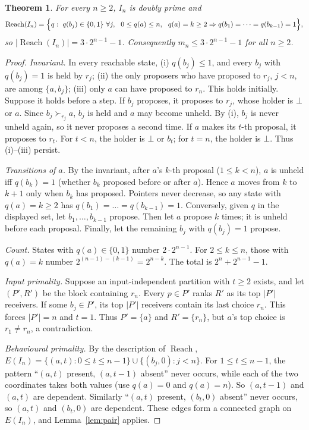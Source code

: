 \documentclass[11pt]{article}
\newtheorem{theorem}{Theorem}
\theoremstyle{definition}
\begin{document}
\begin{theorem}\label{thm:upper}
For every $n\ge2$, $I_n$ is doubly prime and
\[
\operatorname{Reach}(I_n)=\Bigl\{q:\ q(b_j)\in\{0,1\}\ \forall j,\ \ 0\le q(a)\le n,\ \
q(a)=k\ge2\Rightarrow q(b_1)=\dots=q(b_{k-1})=1\Bigr\},
\]
so $|\operatorname{Reach}(I_n)|=3\cdot2^{n-1}-1$. Consequently $m_n\le3\cdot2^{n-1}-1$ for all $n\ge2$.
\end{theorem}
\begin{proof}
\emph{Invariant.} In every reachable state, (i) $q(b_j)\le1$, and every $b_j$ with $q(b_j)=1$ is
held by $r_j$; (ii) the only proposers who have proposed to $r_j$, $j<n$, are among
$\{a,b_j\}$; (iii) only $a$ can have proposed to $r_n$. This holds initially. Suppose it holds before a step. If
$b_j$ proposes, it proposes to $r_j$, whose holder is $\bot$ or $a$. Since $b_j\succ_{r_j}a$, $b_j$ is held
and $a$ may become unheld. By (i), $b_j$ is never unheld again, so it never proposes a second time. If $a$
makes its $t$-th proposal, it proposes to $r_t$. For $t<n$, the holder is $\bot$ or $b_t$; for $t=n$, the holder is $\bot$.
Thus (i)--(iii) persist.

\emph{Transitions of $a$.} By the invariant, after $a$'s $k$-th proposal ($1\le k<n$), $a$ is unheld iff
$q(b_k)=1$ (whether $b_k$ proposed before or after $a$). Hence $a$ moves from $k$ to $k+1$ only
when $b_k$ has proposed. Pointers never decrease, so any state with $q(a)=k\ge2$ has
$q(b_1)=\dots=q(b_{k-1})=1$. Conversely, given $q$ in the displayed set, let $b_1,\dots,b_{k-1}$
propose. Then let $a$ propose $k$ times; it is unheld before each proposal. Finally, let the remaining
$b_j$ with $q(b_j)=1$ propose.

\emph{Count.} States with $q(a)\in\{0,1\}$ number $2\cdot2^{n-1}$. For $2\le k\le n$, those with
$q(a)=k$ number $2^{(n-1)-(k-1)}=2^{n-k}$. The total is $2^n+2^{n-1}-1$.

\emph{Input primality.} Suppose an input-independent partition with $t\ge2$ exists, and let $(P',R')$
be the block containing $r_n$. Every $p\in P'$ ranks $R'$ as its top $|P'|$ receivers. If some
$b_j\in P'$, its top $|P'|$ receivers contain its last choice $r_n$. This forces $|P'|=n$ and
$t=1$. Thus $P'=\{a\}$ and $R'=\{r_n\}$, but $a$'s top choice is $r_1\ne r_n$, a contradiction.

\emph{Behavioural primality.} By the description of $\operatorname{Reach}$,
$E(I_n)=\{(a,t):0\le t\le n-1\}\cup\{(b_j,0):j<n\}$. For $1\le t\le n-1$, the
pattern ``$(a,t)$ present, $(a,t-1)$ absent'' never occurs, while each of the two coordinates
takes both values (use $q(a)=0$ and $q(a)=n$). So $(a,t-1)$ and $(a,t)$ are dependent. Similarly ``$(a,t)$ present, $(b_t,0)$ absent'' never
occurs, so $(a,t)$ and $(b_t,0)$ are dependent. These edges form a connected graph on
$E(I_n)$, and Lemma~\ref{lem:pair} applies.
\end{proof}
\end{document}
